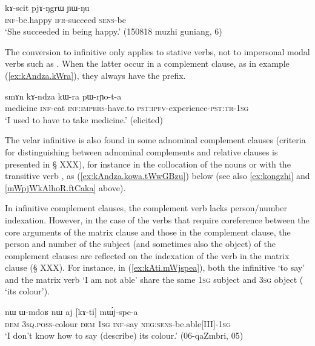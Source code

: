 \begin{exe}
\ex \label{ex:kAscit}
 \gll  kɤ-scit pjɤ-ŋgrɯ ɲɯ-ŋu  \\
 \textsc{inf}-be.happy \textsc{ifr}-succeed \textsc{sens}-be \\
 \glt `She succeeded in being happy.' (150818 muzhi guniang, 6)
 \end{exe} 
 
The conversion to  infinitive only applies to stative verbs, not to  impersonal modal verbs such as . When the latter occur in a complement clause, as in example (\ref{ex:kAndza.kWra}), they always have the  prefix.

\begin{exe}
\ex \label{ex:kAndza.kWra}
\gll  smɤn kɤ-ndza kɯ-ra pɯ-rɲo-t-a  \\ 
medicine \textsc{inf}-eat \textsc{inf:impers}-have.to  \textsc{pst:ipfv}-experience-\textsc{pst:tr-1sg} \\
\glt `I used to have to take medicine.' (elicited)
\end{exe} 
 
The velar infinitive is also found in some adnominal complement clauses (criteria for distinguishing between adnominal complements and relative clauses is presented in § XXX), for instance in the collocation of  the nouns  or  with the transitive verb , as (\ref{ex:kAndza.kowa.tWwGBzu}) below (see also \ref{ex:kongzhi} and \ref{mWpjWkAlhoR.ftCaka} above). 

In infinitive complement clauses, the complement verb lacks person/number indexation. However, in the case of the verbs that require coreference between the core arguments of the matrix clause and those in the complement clause, the person and number of the subject (and sometimes also the object) of the complement clauses are reflected on the indexation of the verb in the matrix clause (§ XXX). For instance, in (\ref{ex:kAti.mWjspea}), both the infinitive  `to say' and the matrix verb  `I am not able' share the same \textsc{1sg} subject and \textsc{3sg} object ( `its colour').  

\begin{exe}
\ex \label{ex:kAti.mWjspea}
\gll nɯ ɯ-mdoʁ nɯ aj [kɤ-ti] mɯ́j-spe-a \\
\textsc{dem} \textsc{3sq}.\textsc{poss}-colour \textsc{dem} \textsc{1sg} \textsc{inf}-say \textsc{neg}:\textsc{sens}-be.able[III]-\textsc{1sg} \\
\glt `I don't know how to say (describe) its colour.' (06-qaZmbri, 05)
  \end{exe} 
  
